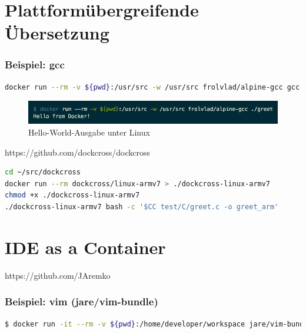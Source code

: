 \section{Plattformübergreifende Übersetzung}
\label{sec:plattformuebergreifende-uebersetzung}
\subsubsection{Beispiel: gcc}
\begin{lstlisting}[caption=Docker-Kommando zum Übersetzen eines C-Programmes mit gcc, language=bash, label=lst:docker-run-gcc]
docker run --rm -v ${pwd}:/usr/src -w /usr/src frolvlad/alpine-gcc gcc -o greet greet.c
\end{lstlisting}

\begin{figure}[htbp]
    \centering
    \includegraphics[width=0.8\linewidth,clip]{images/greet-output}
    \caption{Hello-World-Ausgabe unter Linux}
\label{fig:greet-output}
\end{figure}

https://github.com/dockcross/dockcross

\begin{lstlisting}[caption=Kommandos zum Kompilieren mit dockcross, language=bash, label=lst:dockercross-arm-greet]
cd ~/src/dockcross
docker run --rm dockcross/linux-armv7 > ./dockcross-linux-armv7
chmod +x ./dockcross-linux-armv7
./dockcross-linux-armv7 bash -c '$CC test/C/greet.c -o greet_arm'
\end{lstlisting}

\section{IDE as a Container}
\label{sec:ideasacontainer}
https://github.com/JAremko

\subsubsection{Beispiel: vim (jare/vim-bundle)}
\begin{lstlisting}[caption=Docker-Kommando zum Starten von vim, language=bash, label=lst:docker-run-vim]
$ docker run -it --rm -v ${pwd}:/home/developer/workspace jare/vim-bundle
\end{lstlisting}

